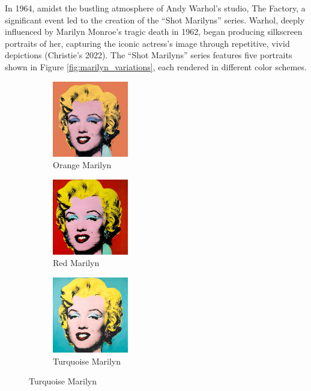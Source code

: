 \documentclass{article}
\begin{document}
In 1964, amidst the bustling atmosphere of Andy Warhol's studio, The
Factory, a significant event led to the creation of the ``Shot
Marilyns'' series. Warhol, deeply influenced by Marilyn Monroe's tragic
death in 1962, began producing silkscreen portraits of her, capturing
the iconic actress's image through repetitive, vivid depictions
(Christie's 2022). The ``Shot Marilyns'' series features five portraits
shown in Figure \ref{fig:marilyn_variations}, each rendered in different
color schemes.

\begin{figure}[ht]
  \centering
  \begin{subfigure}{0.3\textwidth}
    \centering
    \includegraphics[width=125px]{main_files/figure-latex/1_1_orange_marilyn.jpg}
    \caption{Orange Marilyn}
    \label{fig:1_1_orange_marilyn}
  \end{subfigure}
  \hfill
  \begin{subfigure}{0.3\textwidth}
    \centering
    \includegraphics[width=125px]{main_files/figure-latex/1_2_red_marilyn.jpg}
    \caption{Red Marilyn}
    \label{fig:1_2_red_marilyn}
  \end{subfigure}
  \hfill
  \begin{subfigure}{0.3\textwidth}
    \centering
    \includegraphics[width=125px]{main_files/figure-latex/1_3_turq_marilyn.jpg}
    \caption{Turquoise Marilyn}
    \label{fig:1_3_turq_marilyn}
  \end{subfigure}


\end{figure}
\end{document}

